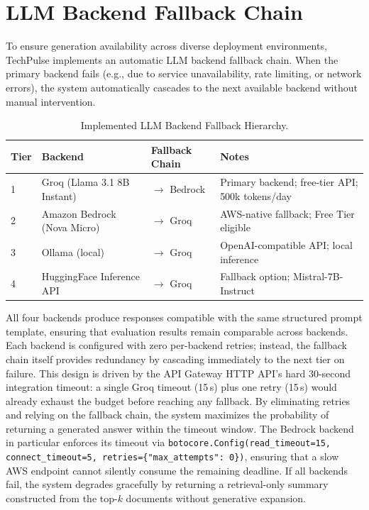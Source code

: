 \section{LLM Backend Fallback Chain}
\label{sec:llm_fallback}

To ensure generation availability across diverse deployment environments, TechPulse implements an automatic LLM backend fallback chain. When the primary backend fails (e.g., due to service unavailability, rate limiting, or network errors), the system automatically cascades to the next available backend without manual intervention.

\begin{table}[H]
\caption{Implemented LLM Backend Fallback Hierarchy.}
\label{tab:llm_backends}
\centering
\begin{tabular}{p{0.5cm}p{3.5cm}p{4.0cm}p{4.0cm}}
\toprule
\textbf{Tier} & \textbf{Backend} & \textbf{Fallback Chain} & \textbf{Notes} \\
\midrule
1 & Groq (Llama 3.1 8B Instant) & $\to$ Bedrock & Primary backend; free-tier API; 500k tokens/day \\[4pt]
2 & Amazon Bedrock (Nova Micro) & $\to$ Groq & AWS-native fallback; Free Tier eligible \\[4pt]
3 & Ollama (local) & $\to$ Groq & OpenAI-compatible API; local inference \\[4pt]
4 & HuggingFace Inference API & $\to$ Groq & Fallback option; Mistral-7B-Instruct \\
\bottomrule
\end{tabular}
\end{table}

All four backends produce responses compatible with the same structured prompt template, ensuring that evaluation results remain comparable across backends. Each backend is configured with zero per-backend retries; instead, the fallback chain itself provides redundancy by cascading immediately to the next tier on failure. This design is driven by the API Gateway HTTP API's hard 30-second integration timeout: a single Groq timeout (15\,s) plus one retry (15\,s) would already exhaust the budget before reaching any fallback. By eliminating retries and relying on the fallback chain, the system maximizes the probability of returning a generated answer within the timeout window. The Bedrock backend in particular enforces its timeout via \texttt{botocore.Config(read\_timeout=15, connect\_timeout=5, retries=\{"max\_attempts": 0\})}, ensuring that a slow AWS endpoint cannot silently consume the remaining deadline. If all backends fail, the system degrades gracefully by returning a retrieval-only summary constructed from the top-$k$ documents without generative expansion.

